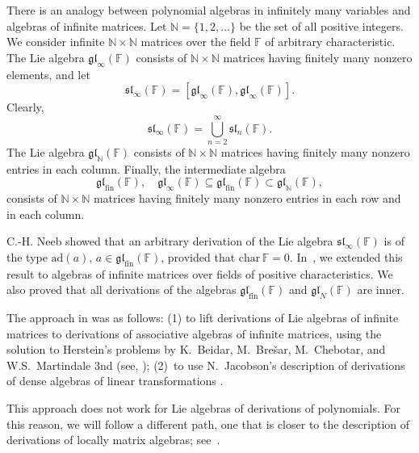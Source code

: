 \documentclass[12pt,a4paper]{amsart}
\theoremstyle{plain}
\begin{document}
	
	
	
	There is an analogy between polynomial algebras in infinitely many variables and algebras of infinite matrices. Let $\mathbb{N}=\{1,2,\ldots\}$ be the set of all positive integers. We consider infinite $\mathbb{N} \times \mathbb{N}$ matrices over the field $\mathbb{F}$ of arbitrary characteristic. The Lie algebra $\mathfrak{gl}_\infty(\mathbb{F})$ consists of $\mathbb{N} \times \mathbb{N}$ matrices having finitely many nonzero elements, and let $$\mathfrak{sl}_\infty(\mathbb{F}) = [\mathfrak{gl}_\infty(\mathbb{F}), \mathfrak{gl}_\infty(\mathbb{F})].$$ Clearly, $$\mathfrak{sl}_\infty(\mathbb{F}) = \bigcup_{n=2}^{\infty} \mathfrak{sl}_n(\mathbb{F}).$$ The Lie algebra $\mathfrak{gl}_{\mathbb{N}}(\mathbb{F})$ consists of $\mathbb{N} \times \mathbb{N}$ matrices having finitely many nonzero entries in each column. Finally, the intermediate algebra $$\mathfrak{gl}_{\text{fin}}(\mathbb{F}), \quad  \mathfrak{gl}_{\infty}(\mathbb{F}) \subseteq \mathfrak{gl}_{\text{fin}}(\mathbb{F}) \subset \mathfrak{gl}_{\mathbb{N}}(\mathbb{F}),$$ consists of $\mathbb{N} \times \mathbb{N}$ matrices having finitely many nonzero entries in each row and in each column.
	
	
	
	
	C.-H. Neeb \cite{Neeb} showed that an arbitrary derivation of the Lie algebra $\mathfrak{sl}_\infty(\mathbb{F})$ is of the type $\text{ad}(a)$, $a \in \mathfrak{gl}_{\text{fin}}(\mathbb{F})$, provided that $\text{char} \, \mathbb{F} = 0$. In~\cite{Bezushchak2,Bezushchak_Kashuba_Zelmanov}, we extended this result to algebras of infinite matrices over fields of positive characteristics. We also proved that all derivations of the algebras $\mathfrak{gl}_{\text{fin}}(\mathbb{F})$ and $\mathfrak{gl}_N(\mathbb{F})$ are inner.
	
	The approach in \cite{Bezushchak2} was as follows:
	(1) to lift derivations of Lie algebras of infinite matrices to derivations of associative algebras of infinite matrices, using the solution to Herstein's problems by K.~Beidar, M.~Bre\v sar, M.~Chebotar, and W.S.~Martindale 3nd  (see, \cite{Bei_Bre_Cheb_Mart_1,Bei_Bre_Cheb_Mart_2,Bei_Bre_Cheb_Mart_3});
	(2)~to use N.~Jacobson's description of derivations of dense algebras of linear transformations \cite{Jacobson}.
	
	This approach does not work for Lie algebras of derivations of polynomials. For this reason, we will follow a different path, one that is closer to the description of derivations of locally matrix algebras; see~\cite{Bezushchak1,BezOl_2}.
	
\end{document}
